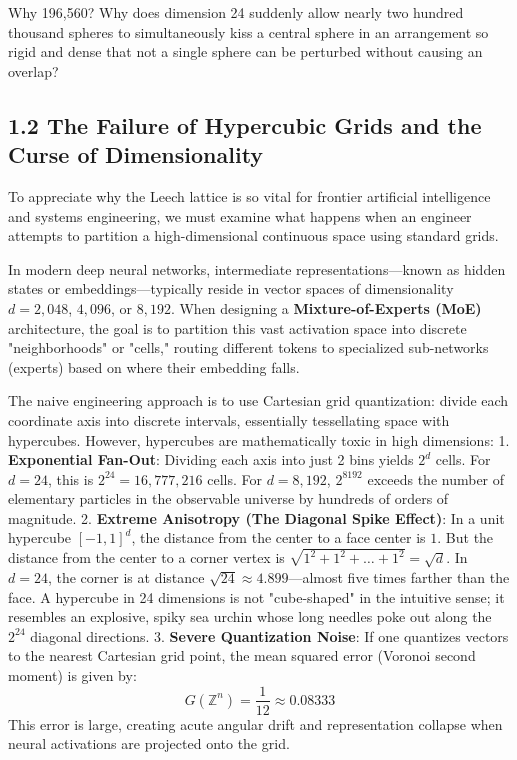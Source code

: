 \documentclass[11pt,twoside,openright]{amsbook}
\begin{document}
Why 196,560? Why does dimension 24 suddenly allow nearly two hundred thousand spheres to simultaneously kiss a central sphere in an arrangement so rigid and dense that not a single sphere can be perturbed without causing an overlap?

\subsection{1.2 The Failure of Hypercubic Grids and the Curse of Dimensionality}

To appreciate why the Leech lattice is so vital for frontier artificial intelligence and systems engineering, we must examine what happens when an engineer attempts to partition a high-dimensional continuous space using standard grids.

In modern deep neural networks, intermediate representations—known as hidden states or embeddings—typically reside in vector spaces of dimensionality $d = 2,048$, $4,096$, or $8,192$. When designing a \textbf{Mixture-of-Experts (MoE)} architecture, the goal is to partition this vast activation space into discrete "neighborhoods" or "cells," routing different tokens to specialized sub-networks (experts) based on where their embedding falls.

The naive engineering approach is to use Cartesian grid quantization: divide each coordinate axis into discrete intervals, essentially tessellating space with hypercubes. However, hypercubes are mathematically toxic in high dimensions:
1. \textbf{Exponential Fan-Out}: Dividing each axis into just 2 bins yields $2^d$ cells. For $d = 24$, this is $2^{24} = 16,777,216$ cells. For $d = 8,192$, $2^{8192}$ exceeds the number of elementary particles in the observable universe by hundreds of orders of magnitude.
2. \textbf{Extreme Anisotropy (The Diagonal Spike Effect)}: In a unit hypercube $[-1, 1]^d$, the distance from the center to a face center is $1$. But the distance from the center to a corner vertex is $\sqrt{1^2 + 1^2 + \dots + 1^2} = \sqrt{d}$. In $d = 24$, the corner is at distance $\sqrt{24} \approx 4.899$—almost five times farther than the face. A hypercube in 24 dimensions is not "cube-shaped" in the intuitive sense; it resembles an explosive, spiky sea urchin whose long needles poke out along the $2^{24}$ diagonal directions.
3. \textbf{Severe Quantization Noise}: If one quantizes vectors to the nearest Cartesian grid point, the mean squared error (Voronoi second moment) is given by:
   $$G(\mathbb{Z}^n) = \frac{1}{12} \approx 0.08333$$
   This error is large, creating acute angular drift and representation collapse when neural activations are projected onto the grid.
\end{document}
